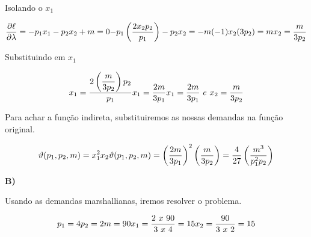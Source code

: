 \documentclass[a4paper, 12pt]{article} %
\begin{document}
\begin{flushleft}
\begin{center}
Isolando o $x_{1}$
\end{center}

\begin{equation}
\frac{\partial\ell}{\partial \lambda} = -p_{1}x_{1} - p_{2}x_{2} + m = 0
$$\\$$
-p_{1}\left(\dfrac{2x_{2}p_{2}}{p_{1}}\right) - p_{2}x_{2} = -m (-1)
$$\\$$
x_{2}(3p_{2}) = m
$$\\$$
x_{2} = \dfrac{m}{3p_{2}}
\end{equation}

\begin{center}
Substituindo em $x_{1}$
\end{center}

\begin{equation}
x_{1} = \dfrac {2 \left( \dfrac{m}{3p_{2}}\right)p_{2}} {p_{1}}
$$\\$$
x_{1} = \dfrac{2m}{3p_{1}}
$$\\$$
x_{1} = \dfrac{2m}{3p_{1}} \  e \ x_{2} = \dfrac{m}{3p_{2}}
\end{equation}
\begin{center}
Para achar a função indireta, substituiremos as nossas demandas na função original.
\end{center}

\begin{equation}
\vartheta(p_{1},p_{2},m) = x_{1}^{2}x_{2}
$$\\$$
\vartheta(p_{1},p_{2},m) = \left( \dfrac{2m}{3p_{1}} \right)^{2} \left( \dfrac{m}{3p_{2}} \right) =  \dfrac{4}{27} \left(\dfrac{m^{3}}{p_{1}^{2}p_{2}}        \right)
\end{equation}

\singlespacing

\textbf{B)}

\begin{center}
Usando as demandas marshallianas, iremos resolver o problema.
\end{center}

\begin{equation}
p_{1} = 4
$$\\$$
p_{2} = 2
$$\\$$
m = 90
$$\\$$
x_{1} = \dfrac{2 \ x \ 90}{3 \ x \ 4} = 15
$$\\$$
x_{2} = \dfrac{90}{3 \ x \ 2} = 15
\end{equation}

\singlespacing


\end{flushleft}
\end{document}
